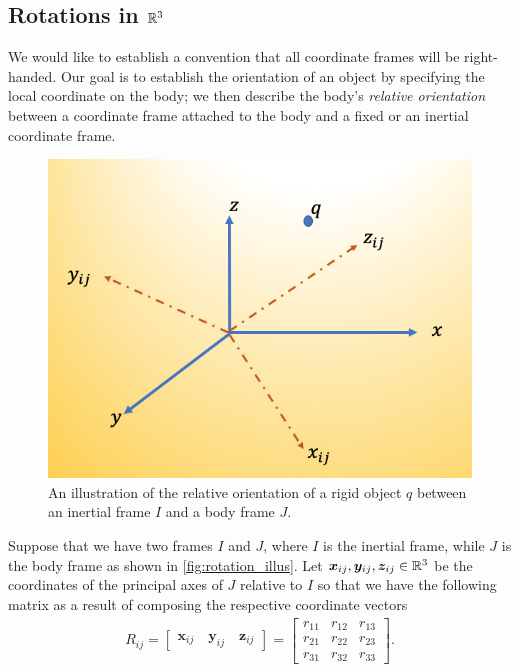 \subsection{Rotations in $\mathbb{R}^3$}
%
We would like to establish a convention  that all coordinate frames will be right-handed. Our goal is to establish the orientation of an object by specifying the local coordinate on the body; we then describe the body's \textit{relative orientation} between a coordinate frame attached to the body and a fixed or an inertial coordinate frame. 
%
\begin{figure}[tb!]
	\centering
	\includegraphics[width=\columnwidth]{figures/rotation_illus.jpg}
	\caption{An illustration of the relative orientation of a rigid object $q$ between an inertial frame $I$ and a body frame $J$.}
	\label{fig:rotation_illus}
\end{figure}
%
Suppose that we have two frames $I$ and $J$, where $I$ is the inertial frame, while $J$ is the body frame as shown in \autoref{fig:rotation_illus}. Let $\bm{x}_{ij}, \bm{y}_{ij},\bm{z}_{ij} \in \mathbb{R}^3$ be the coordinates of the principal axes of $J$ relative to $I$ so that we have the following matrix as a result of composing the respective coordinate vectors
%
\begin{align}
R_{ij} = \begin{bmatrix}
\bm{x}_{ij} \quad  \bm{y}_{ij} \quad \bm{z}_{ij}
\end{bmatrix} = \begin{bmatrix}
r_{11} &  r_{12} & r_{13} \\
r_{21} & r_{22} &  r_{23} \\
r_{31} & r_{32} &  r_{33}
\end{bmatrix}.
\label{eq:rotation_compoz}
\end{align}
